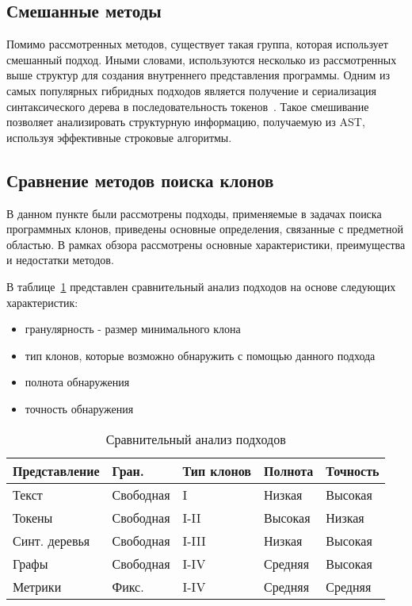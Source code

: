 \subsection{Смешанные методы}

Помимо рассмотренных методов, существует такая группа, которая использует смешанный подход. Иными словами, используются несколько из рассмотренных выше структур для создания внутреннего представления программы. Одним из самых популярных гибридных подходов является получение и сериализация синтаксического дерева в последовательность токенов~\cite{hybrid}. Такое смешивание позволяет анализировать структурную информацию, получаемую из AST, используя эффективные строковые алгоритмы. 

\subsection{Сравнение методов поиска клонов}

В данном пункте были рассмотрены подходы, применяемые в задачах поиска программных клонов, приведены основные определения, связанные с предметной областью. В рамках обзора рассмотрены основные характеристики, преимущества и недостатки методов.

В таблице~\ref{compare} представлен сравнительный анализ подходов на основе следующих характеристик:
\begin{itemize}
\setlength\itemsep{0mm}
\item гранулярность - размер минимального клона
\item тип клонов, которые возможно обнаружить с помощью данного подхода
\item полнота обнаружения
\item точность обнаружения
\end{itemize}

\begin{table}[H]
\centering
\captionsetup{skip=5pt}
\caption{Сравнительный анализ подходов}
\label{compare}
\begin{tabular}{|l|l|l|l|l|}
\hline
Представление    & Гран.		& Тип клонов & Полнота	& Точность \\ \hline
Текст            & Свободная    & I          & Низкая  	& Высокая  \\ \hline
Токены           & Свободная    & I-II       & Высокая 	& Низкая   \\ \hline
Синт. деревья	 & Свободная    & I-III      & Низкая  	& Высокая  \\ \hline
Графы            & Свободная    & I-IV       & Средняя 	& Высокая  \\ \hline
Метрики          & Фикс.		& I-IV       & Средняя 	& Средняя  \\ \hline
\end{tabular}
\end{table}

